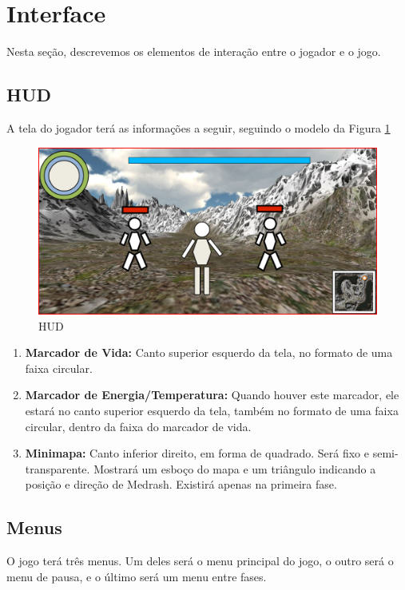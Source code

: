 \section{Interface}

Nesta seção, descrevemos os elementos de interação entre o jogador e o
jogo.

\subsection{HUD}

A tela do jogador terá as informações a seguir, seguindo o modelo da
Figura \ref{fig:hud}
\begin{figure}[!ht]
 \centering
 \includegraphics[scale=0.59]{hud.png}
 \caption{HUD}
 \label{fig:hud}
\end{figure}
\begin{enumerate}
 \item {\bf Marcador de Vida:} Canto superior esquerdo da tela, no 
formato de uma faixa circular.
 \item {\bf Marcador de Energia/Temperatura:} Quando houver este marcador,
ele estará no canto superior esquerdo da tela, também no formato
de uma faixa circular, dentro da faixa do marcador de vida.
 \item {\bf Minimapa:} Canto inferior direito, em forma de quadrado.
Será fixo e semi-transparente. Mostrará um esboço do mapa e um triângulo
indicando a posição e direção de Medrash. Existirá apenas na primeira fase.
\end{enumerate}

\subsection{Menus}

O jogo terá três menus. Um deles será o menu principal do jogo, o 
outro será o menu de pausa, e o último será um menu entre fases.

